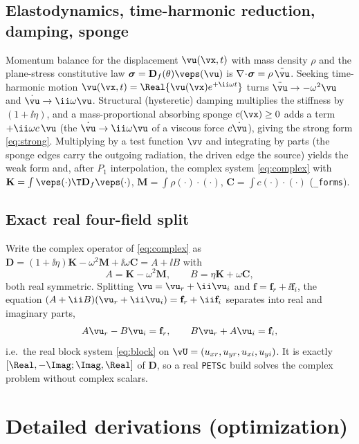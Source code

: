 \subsection{Elastodynamics, time-harmonic reduction, damping, sponge}
Momentum balance for the displacement $\vu(\vx,t)$ with mass density $\rho$ and
the plane-stress constitutive law $\bm\sigma=\mathbf D_f(\theta)\veps(\vu)$ is
$\nabla\!\cdot\!\bm\sigma=\rho\,\ddot{\vu}$. Seeking time-harmonic motion
$\vu(\vx,t)=\Real\{\vu(\vx)e^{+\ii\omega t}\}$ turns $\ddot{\vu}\to-\omega^2\vu$ and $\dot\vu\to\ii\omega\vu$.
Structural (hysteretic) damping multiplies the stiffness by $(1+\ii\eta)$, and a
mass-proportional absorbing sponge $c(\vx)\ge0$ adds a term $+\ii\omega c\,\vu$
(the $\dot{\vu}\to\ii\omega\vu$ of a viscous force $c\dot\vu$), giving the strong
form \eqref{eq:strong}. Multiplying by a test function $\vv$ and integrating by
parts (the sponge edges carry the outgoing radiation, the driven edge the source)
yields the weak form and, after $P_1$ interpolation, the complex system
\eqref{eq:complex} with
$\mathbf K=\int\veps(\cdot)\T\mathbf D_f\veps(\cdot)$,
$\mathbf M=\int\rho(\cdot)\!\cdot\!(\cdot)$,
$\mathbf C=\int c(\cdot)\!\cdot\!(\cdot)$ (\texttt{\_forms}).

\subsection{Exact real four-field split}
Write the complex operator of \eqref{eq:complex} as
$\mathbf D=(1+\ii\eta)\mathbf K-\omega^2\mathbf M+\ii\omega\mathbf C=A+\ii B$ with
\begin{equation}
  A=\mathbf K-\omega^2\mathbf M,\qquad B=\eta\mathbf K+\omega\mathbf C,
\end{equation}
both real symmetric. Splitting $\vu=\vu_r+\ii\vu_i$ and $\mathbf f=\mathbf
f_r+\ii\mathbf f_i$, the equation $(A+\ii B)(\vu_r+\ii\vu_i)=\mathbf f_r+\ii\mathbf
f_i$ separates into real and imaginary parts,
\begin{equation}
  A\vu_r-B\vu_i=\mathbf f_r,\qquad B\vu_r+A\vu_i=\mathbf f_i,
\end{equation}
i.e.\ the real block system \eqref{eq:block} on
$\vU=(u_{xr},u_{yr},u_{xi},u_{yi})$. It is exactly $[\Real,-\Imag;\Imag,\Real]$ of
$\mathbf D$, so a real \texttt{PETSc} build solves the complex problem without
complex scalars.

\section{Detailed derivations (optimization)}
\label{app:derivopt}

